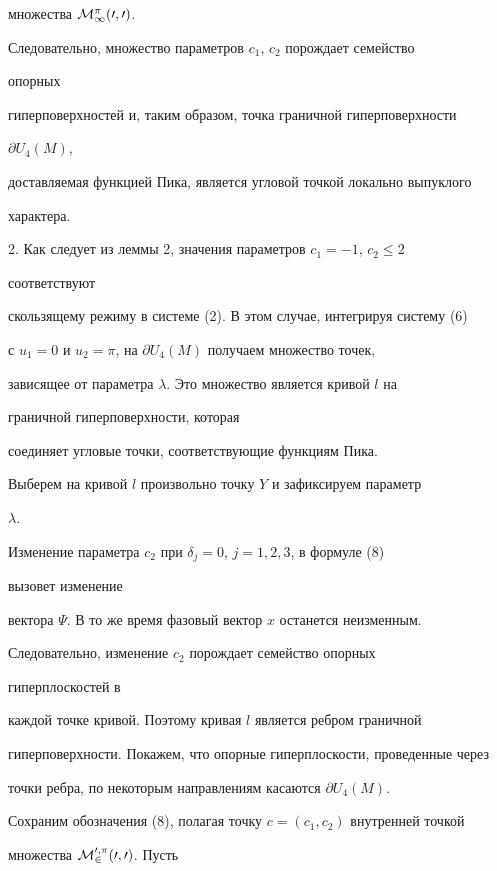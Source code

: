 множества $\cal M^\pi_1(0,0)$.


Следовательно, множество параметров $c_1$, $c_2$ порождает семейство


опорных


гиперповерхностей и, таким образом, точка граничной гиперповерхности


$\partial U_4(M)$,


доставляемая функцией Пика, является угловой точкой локально выпуклого


характера.


\medskip





2. Как следует из леммы 2, значения параметров $c_1=-1$, $c_2\le 2$


соответствуют


скользящему режиму в системе (2). В этом случае, интегрируя систему (6)


с $u_1=0$ и $u_2=\pi$, на $\partial U_4(M)$ получаем множество точек,


зависящее от параметра $\lambda$. Это множество является кривой $l$ на


граничной гиперповерхности, которая


соединяет угловые точки, соответствующие функциям Пика.





Выберем на кривой $l$ произвольно точку $Y$ и зафиксируем параметр


$\lambda$.


Изменение параметра $c_2$ при $\delta_j=0$, $j=1,2,3$, в формуле (8)


вызовет изменение


вектора $\Psi$. В то же время фазовый вектор $x$ останется неизменным.


Следовательно, изменение $c_2$ порождает семейство опорных


гиперплоскостей в


каждой точке кривой. Поэтому кривая $l$ является ребром граничной


гиперповерхности. Покажем, что опорные гиперплоскости, проведенные через


точки ребра, по некоторым направлениям касаются $\partial U_4(M)$.


Сохраним обозначения (8), полагая точку $c=(c_1,c_2)$ внутренней точкой


множества $\cal M^{0,\pi}_2(0,0)$. Пусть


